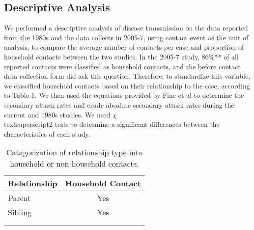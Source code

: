 \subsection{Descriptive Analysis}
We performed a descriptive analysis of disease transmission on the data reported from the 1980s and the data collects in 2005-7, using contact event as the unit of analysis, to compare the average number of contacts per case and proportion of household contacts between the two studies. In the 2005-7 study, 86\%** of all reported contacts were classified as household contacts, and the before contact data collection form did ask this question. Therefore, to standardize this variable, we classified household contacts based on their relationship to the case, according to Table 1. We then used the equations provided by Fine et al \cite{Fine1988} to determine the secondary attack rates and crude absolute secondary attack rates during the current and 1980s studies. We used $\chi$\\textsuperscript{2} tests to determine a significant differences between the characteristics of each study.

\begin{table} 
\centering
\caption{Catagorization of relationship type into household or non-household contacts.} 
    \begin{tabular}{ l c }
    \toprule
        Relationship & Household Contact \\ 
        \midrule
        Parent & Yes \\ 
        Sibling & Yes \\ 
         &  \\ 
         &  \\ 
         \bottomrule
    \end{tabular} 
    \label{Table 1}
\end{table}